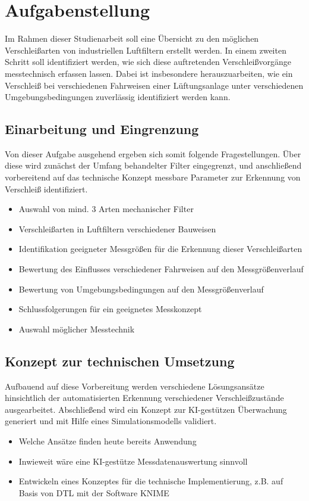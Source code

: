 \chapter{Aufgabenstellung}
\label{ch: Aufgabenstellung}
Im Rahmen dieser Studienarbeit soll eine Übersicht zu den möglichen Verschleißarten von industriellen Luftfiltern erstellt werden. In einem zweiten Schritt soll identifiziert werden, wie sich diese auftretenden Verschleißvorgänge messtechnisch erfassen lassen. Dabei ist insbesondere herauszuarbeiten, wie ein Verschleiß bei verschiedenen Fahrweisen einer Lüftungsanlage unter verschiedenen Umgebungsbedingungen zuverlässig identifiziert werden kann.
\section{Einarbeitung und Eingrenzung}
Von dieser Aufgabe ausgehend ergeben sich somit folgende Fragestellungen. Über diese wird zunächst der Umfang behandelter Filter eingegrenzt, und anschließend vorbereitend auf das technische Konzept messbare Parameter zur Erkennung von Verschleiß identifiziert.
\begin{itemize}
    \item Auswahl von mind. 3 Arten mechanischer Filter
    \item Verschleißarten in Luftfiltern verschiedener Bauweisen
    \item Identifikation geeigneter Messgrößen für die Erkennung dieser Verschleißarten
    \item Bewertung des Einflusses verschiedener Fahrweisen auf den Messgrößenverlauf
    \item Bewertung von Umgebungsbedingungen auf den Messgrößenverlauf
    \item Schlussfolgerungen für ein geeignetes Messkonzept
    \item Auswahl möglicher Messtechnik
\end{itemize}
\section{Konzept zur technischen Umsetzung}
Aufbauend auf diese Vorbereitung werden verschiedene Lösungsansätze hinsichtlich der automatisierten Erkennung verschiedener Verschleißzustände ausgearbeitet. Abschließend wird ein Konzept zur KI-gestützen Überwachung generiert und mit Hilfe eines Simulationsmodells validiert.
\begin{itemize}
    \item Welche Ansätze finden heute bereits Anwendung
    \item Inwieweit wäre eine KI-gestütze Messdatenauswertung sinnvoll
    \item Entwickeln eines Konzeptes für die technische Implementierung, z.B. auf Basis von DTL mit der Software KNIME
\end{itemize}